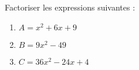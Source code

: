 \begin{minipage}{0.99\linewidth}

\exo

Factoriser les expressions suivantes :


\begin{enumerate}

\item $A = x^2+6x+9$

\item $B = 9x^2-49$

\item $C = 36x ^2-24x+4$

\end{enumerate}

\end{minipage}

\vspace{0.5cm}

